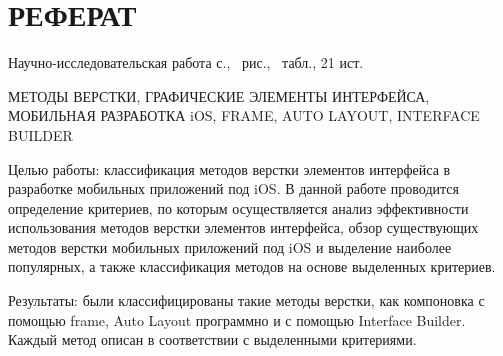 \section*{РЕФЕРАТ}

Научно-исследовательская работа \pageref{LastPage} с., \totalfigures\ рис., \totaltables\ табл., 21 ист.

МЕТОДЫ ВЕРСТКИ, ГРАФИЧЕСКИЕ ЭЛЕМЕНТЫ ИНТЕРФЕЙСА, МОБИЛЬНАЯ РАЗРАБОТКА iOS, FRAME, AUTO LAYOUT, INTERFACE BUILDER


Целью работы: классификация методов верстки элементов интерфейса в разработке мобильных приложений под iOS.
В данной работе проводится определение критериев, по которым осуществляется анализ эффективности использования методов верстки элементов интерфейса, обзор существующих методов верстки мобильных приложений под iOS и выделение наиболее популярных, а также классификация методов на основе выделенных критериев.

Результаты: были классифицированы такие методы верстки, как компоновка с помощью frame, Auto Layout программно и с помощью Interface Builder. Каждый метод описан в соответствии с выделенными критериями. 

\pagebreak
